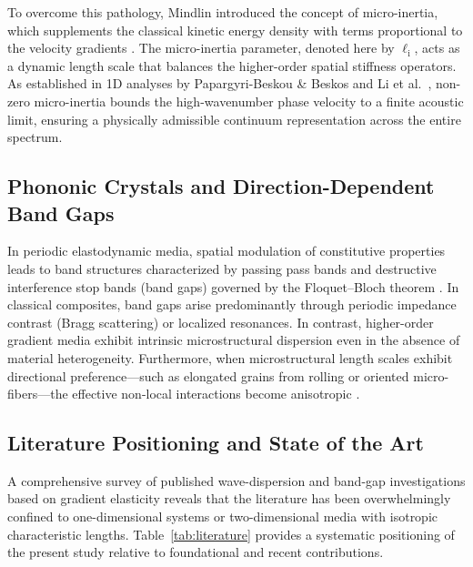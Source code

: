 To overcome this pathology, Mindlin introduced the concept of micro-inertia, which supplements the classical kinetic energy density with terms proportional to the velocity gradients \cite{mindlin1964}. The micro-inertia parameter, denoted here by $\ell_{\mathrm{i}}$, acts as a dynamic length scale that balances the higher-order spatial stiffness operators. As established in 1D analyses by Papargyri-Beskou \& Beskos \cite{papargyribeskou2009} and Li et al.\ \cite{liweizhou2016}, non-zero micro-inertia bounds the high-wavenumber phase velocity to a finite acoustic limit, ensuring a physically admissible continuum representation across the entire spectrum.

\subsection{Phononic Crystals and Direction-Dependent Band Gaps}
In periodic elastodynamic media, spatial modulation of constitutive properties leads to band structures characterized by passing pass bands and destructive interference stop bands (band gaps) governed by the Floquet--Bloch theorem \cite{kushwaha1993}. In classical composites, band gaps arise predominantly through periodic impedance contrast (Bragg scattering) or localized resonances. In contrast, higher-order gradient media exhibit intrinsic microstructural dispersion even in the absence of material heterogeneity. Furthermore, when microstructural length scales exhibit directional preference---such as elongated grains from rolling or oriented micro-fibers---the effective non-local interactions become anisotropic \cite{zhanwei2010}.

\subsection{Literature Positioning and State of the Art}
A comprehensive survey of published wave-dispersion and band-gap investigations based on gradient elasticity reveals that the literature has been overwhelmingly confined to one-dimensional systems or two-dimensional media with isotropic characteristic lengths. Table~\ref{tab:literature} provides a systematic positioning of the present study relative to foundational and recent contributions.

\begin{table}[htbp]
\centering
\caption{Positioning of the present study in the context of published gradient-elastic elastodynamic investigations.}
\label{tab:literature}

\end{table}

